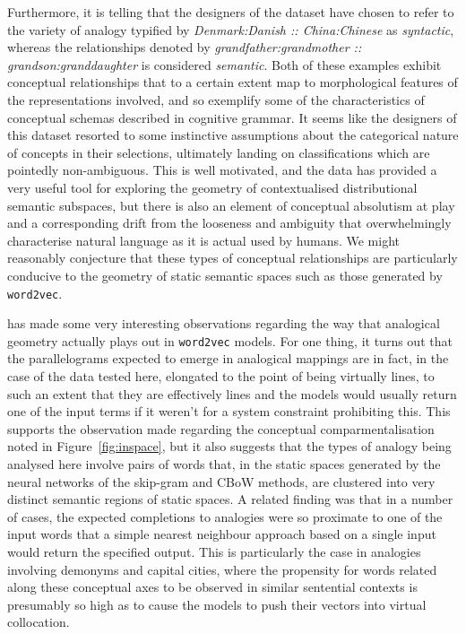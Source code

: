 Furthermore, it is telling that the designers of the dataset have chosen to refer to the variety of analogy typified by \emph{Denmark:Danish :: China:Chinese} as \emph{syntactic}, whereas the relationships denoted by \emph{grandfather:grandmother :: grandson:granddaughter} is considered \emph{semantic}.  Both of these examples exhibit conceptual relationships that to a certain extent map to morphological features of the representations involved, and so exemplify some of the characteristics of conceptual schemas described in  cognitive grammar.  It seems like the designers of this dataset resorted to some instinctive assumptions about the categorical nature of concepts in their selections, ultimately landing on classifications which are pointedly non-ambiguous.  This is well motivated, and the data has provided a very useful tool for exploring the geometry of contextualised distributional semantic subspaces, but there is also an element of conceptual absolutism at play and a corresponding drift from the looseness and ambiguity that overwhelmingly characterise natural language as it is actual used by humans.  We might reasonably conjecture that these types of conceptual relationships are particularly conducive to the geometry of static semantic spaces such as those generated by \texttt{word2vec}.

\cite{Linzen2016} has made some very interesting observations regarding the way that analogical geometry actually plays out in \texttt{word2vec} models.  For one thing, it turns out that the parallelograms expected to emerge in analogical mappings are in fact, in the case of the data tested here, elongated to the point of being virtually lines, to such an extent that they are effectively lines and the models would usually return one of the input terms if it weren't for a system constraint prohibiting this.  This supports the observation made regarding the conceptual comparmentalisation noted in Figure~\ref{fig:inspace}, but it also suggests that the types of analogy being analysed here involve pairs of words that, in the static spaces generated by the neural networks of the skip-gram and CBoW methods, are clustered into very distinct semantic regions of static spaces.  A related finding was that in a number of cases, the expected completions to analogies were so proximate to one of the input words that a simple nearest neighbour approach based on a single input would return the specified output.  This is particularly the case in analogies involving demonyms and capital cities, where the propensity for words related along these conceptual axes to be observed in similar sentential contexts is presumably so high as to cause the models to push their vectors into virtual collocation.

